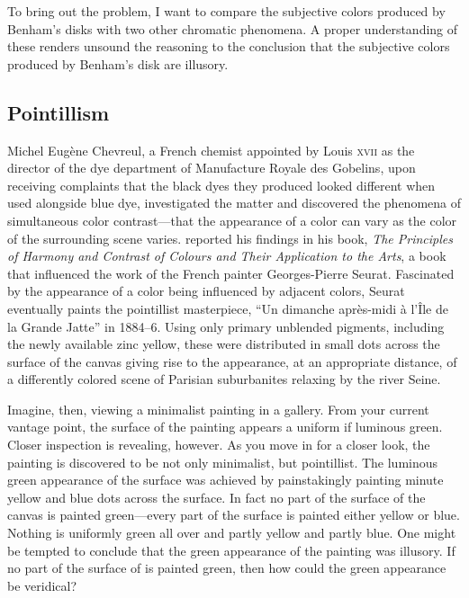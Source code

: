 \documentclass[12pt]{article}
\begin{document}
To bring out the problem, I want to compare the subjective colors produced by Benham's disks with two other chromatic phenomena. A proper understanding of these renders unsound the reasoning to the conclusion that the subjective colors produced by Benham's disk are illusory.


\subsection{Pointillism}\label{sub:pointillism} %

Michel Eugène Chevreul, a French chemist appointed by Louis \textsc{xvii} as the director of the dye department of Manufacture Royale des Gobelins, upon receiving complaints that the black dyes they produced looked different when used alongside blue dye, investigated the matter and discovered the phenomena of simultaneous color contrast---that the appearance of a color can vary as the color of the surrounding scene varies. \citet{Chevreul:1855kx} reported his findings in his book, \emph{The Principles of Harmony and Contrast of Colours and Their Application to the Arts}, a book that influenced the work of the French painter Georges-Pierre Seurat. Fascinated by the appearance of a color being influenced by adjacent colors, Seurat eventually paints the pointillist masterpiece, “Un dimanche après-midi à l'Île de la Grande Jatte” in 1884--6. Using only primary unblended pigments, including the newly available zinc yellow, these were distributed in small dots across the surface of the canvas giving rise to the appearance, at an appropriate distance, of a differently colored scene of Parisian suburbanites relaxing by the river Seine.

Imagine, then, viewing a minimalist painting in a gallery. From your current vantage point, the surface of the painting appears a uniform if luminous green. Closer inspection is revealing, however. As you move in for a closer look, the painting is discovered to be not only minimalist, but pointillist. The luminous green appearance of the surface was achieved by painstakingly painting minute yellow and blue dots across the surface. In fact no part of the surface of the canvas is painted green---every part of the surface is painted either yellow or blue. Nothing is uniformly green all over and partly yellow and partly blue. One might be tempted to conclude that the green appearance of the painting was illusory. If no part of the surface of is painted green, then how could the green appearance be veridical? 
\end{document}

